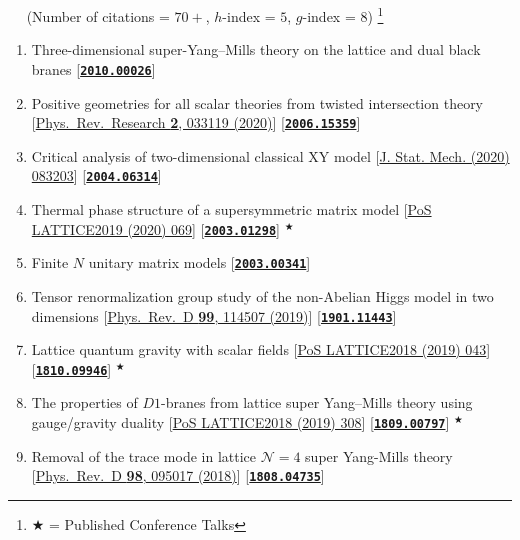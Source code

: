 ~~ (Number of citations = $70+$, $h$-index = $5$, $g$-index = $8$) 
\footnote{$\bigstar$ = Published Conference Talks}
 \begin{enumerate}
 \item Three-dimensional super-Yang--Mills theory on the lattice and dual black branes [\textbf{\texttt{\textcolor{blue}{\href{https://arxiv.org/abs/2010.00026}{2010.00026}}}}] 
 \item Positive geometries for all scalar theories from twisted intersection theory [\href{https://journals.aps.org/prresearch/abstract/10.1103/PhysRevResearch.2.033119}{Phys.\ Rev.\ Research {\bf 2}, 033119 (2020)}] [\texttt{\textbf{\textcolor{blue}{\href{https://arxiv.org/abs/2006.15359}{2006.15359}}}}] 
  \item Critical analysis of two-dimensional classical XY model [\href{https://iopscience.iop.org/article/10.1088/1742-5468/aba686/pdf}{J. Stat. Mech. (2020) 083203}] [\texttt{\textbf{\textcolor{blue}{\href{https://arxiv.org/abs/2004.06314}{2004.06314}}}}] 
 \item Thermal phase structure of a supersymmetric matrix model [\href{https://pos.sissa.it/363/069}{PoS LATTICE2019 (2020) 069}] [\texttt{\textbf{\textcolor{blue}{\href{https://arxiv.org/abs/2003.01298}{2003.01298}}}}] $^{\bigstar}$
 \item  Finite $N$ unitary matrix models [\textbf{\texttt{\textcolor{blue}{\href{https://arxiv.org/abs/2003.00341}{2003.00341}}}}] 
  \item Tensor renormalization group study of the non-Abelian Higgs model in two dimensions [\href{https://journals.aps.org/prd/abstract/10.1103/PhysRevD.99.114507}{Phys.\ Rev.\ D {\bf 99}, 114507 (2019)}] [\texttt{\textbf{\textcolor{blue}{\href{https://arxiv.org/abs/1901.11443}{1901.11443}}}}] 
 \item  Lattice quantum gravity with scalar fields [\href{https://pos.sissa.it/334/043}{PoS LATTICE2018 (2019) 043}] [\texttt{\textbf{\textcolor{blue}{\href{https://arxiv.org/abs/1810.09946}{1810.09946}}}}] $^{\bigstar}$
  \item  The properties of $D1$-branes from lattice super Yang--Mills theory using gauge/gravity duality [\href{https://pos.sissa.it/334/308}{PoS LATTICE2018 (2019) 308}]   [\texttt{\textbf{\textcolor{blue}{\href{https://arxiv.org/abs/1809.00797}{1809.00797}}}}] $^{\bigstar}$
  \item  Removal of the trace mode in lattice $\mathcal{N }= 4$ super Yang-Mills theory [\href{https://journals.aps.org/prd/abstract/10.1103/PhysRevD.98.095017}{Phys.\ Rev.\ D {\bf 98}, 095017 (2018)}] [\texttt{\textbf{\texttt{\textcolor{blue}{\href{https://arxiv.org/abs/1808.04735}{1808.04735}}}}}]  

\end{enumerate}
